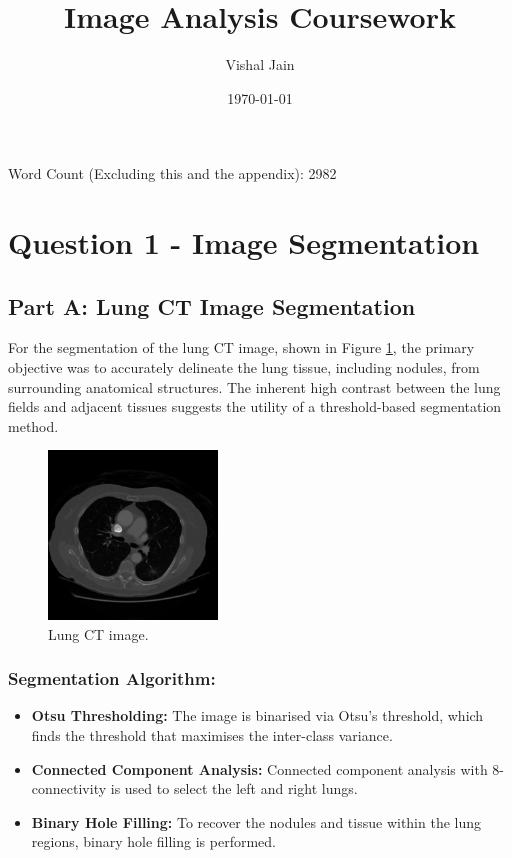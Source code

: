 \documentclass[11pt]{article}
\begin{document}
\title{Image Analysis Coursework}
\author{Vishal Jain}
\date{\today}
\newpage
\maketitle
Word Count (Excluding this and the appendix): 2982
\tableofcontents
\newpage
\section{Question 1 - Image Segmentation}
\subsection{Part A: Lung CT Image Segmentation}
For the segmentation of the lung CT image, shown in Figure \ref{fig:lung_ct}, the primary objective was to accurately delineate the lung tissue, including nodules, from surrounding anatomical structures. The inherent high contrast between the lung fields and adjacent tissues suggests the utility of a threshold-based segmentation method.

\begin{figure}[H]
    \centering
    \includegraphics[width=0.4\textwidth]{../data/CT.png}
    \caption{Lung CT image.}
    \label{fig:lung_ct}
\end{figure}

\subsubsection{Segmentation Algorithm:}

\begin{itemize}
    \item \textbf{Otsu Thresholding:} The image is binarised via Otsu's threshold, which finds the threshold that maximises the inter-class variance.
    \item \textbf{Connected Component Analysis:} Connected component analysis with 8-connectivity is used to select the left and right lungs.
    \item \textbf{Binary Hole Filling:} To recover the nodules and tissue within the lung regions, binary hole filling is performed.
\end{itemize}
\end{document}

